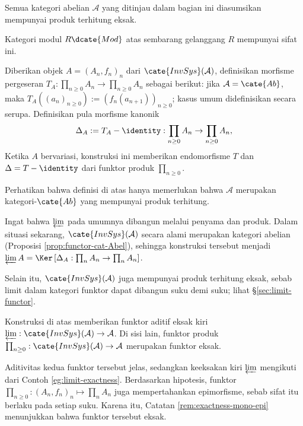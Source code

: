 \begin{hipotesis}\label{hyp:lim1}
Semua kategori abelian $\mathcal{A}$ yang ditinjau dalam bagian ini
diasumsikan mempunyai produk terhitung eksak.
\end{hipotesis}

Kategori modul $R\dcate{Mod}$ atas sembarang gelanggang $R$ mempunyai sifat
ini.

\begin{definisi}\label{def:Delta-diff}
Diberikan objek $A = (A_n, f_n)_n$ dari
$\cate{InvSys}(\mathcal{A})$, definisikan morfisme pergeseran
$T_A: \prod_{n \geq 0} A_n \to \prod_{n \geq 0} A_n$ sebagai berikut:
jika $\mathcal{A} = \cate{Ab}$, maka
$T_A((a_n)_{n \geq 0}) := (f_n(a_{n+1}))_{n \geq 0}$; kasus umum
didefinisikan secara serupa. Definisikan pula morfisme kanonik
\[ \Delta_A := T_A - \identity: \prod_{n \geq 0} A_n \to \prod_{n \geq 0} A_n, \]
Ketika $A$ bervariasi, konstruksi ini memberikan endomorfisme $T$ dan
$\Delta = T - \identity$ dari funktor produk $\prod_{n \geq 0}$.
\end{definisi}

Perhatikan bahwa definisi di atas hanya memerlukan bahwa $\mathcal{A}$
merupakan kategori-$\cate{Ab}$ yang mempunyai produk terhitung.

Ingat bahwa $\varprojlim$ pada umumnya dibangun melalui penyama dan produk.
Dalam situasi sekarang, $\cate{InvSys}(\mathcal{A})$ secara alami merupakan
kategori abelian (Proposisi \ref{prop:functor-cat-Abel}), sehingga konstruksi
tersebut menjadi
$\varprojlim A = \Ker\left[ \Delta_A:
\prod_n A_n \to \prod_n A_n \right]$.

Selain itu, $\cate{InvSys}(\mathcal{A})$ juga mempunyai produk terhitung
eksak, sebab limit dalam kategori funktor dapat dibangun suku demi suku;
lihat \S\ref{sec:limit-functor}.

\begin{lema}
Konstruksi di atas memberikan funktor aditif eksak kiri
$\varprojlim: \cate{InvSys}(\mathcal{A}) \to \mathcal{A}$. Di sisi lain,
funktor produk
$\prod_{n \geq 0}: \cate{InvSys}(\mathcal{A}) \to \mathcal{A}$
merupakan funktor eksak.
\end{lema}
\begin{bukti}
Aditivitas kedua funktor tersebut jelas, sedangkan keeksakan kiri
$\varprojlim$ mengikuti dari Contoh \ref{eg:limit-exactness}. Berdasarkan
hipotesis, funktor
$\prod_{n \geq 0}: (A_n, f_n)_n \mapsto \prod_n A_n$ juga
mempertahankan epimorfisme, sebab sifat itu berlaku pada setiap suku.
Karena itu, Catatan \ref{rem:exactness-mono-epi} menunjukkan bahwa funktor
tersebut eksak.
\end{bukti}

